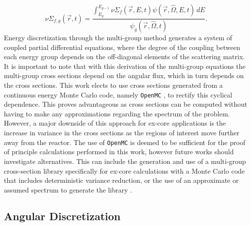 \begin{equation*}
    \nu\Sigma_{f,g}(\vec{r}, t) = \frac{\int_{E_{g}}^{E_{g - 1}}\nu\Sigma_{f}(\vec{r}, E, t)\psi(\vec{r}, \hat{\Omega}, E, t)\, dE}{\psi_{g}(\vec{r}, \hat{\Omega}, t)}\text{.}
\end{equation*}
Energy discretization through the multi-group method generates a system of coupled partial differential equations, where the degree of the coupling between each energy group depends on the off-diagonal elements of the scattering matrix. It is important to note that with this derivation of the multi-group equations the multi-group cross sections depend on the angular flux, which in turn depends on the cross sections. This work elects to use cross sections generated from a continuous energy Monte Carlo code, namely \texttt{OpenMC} \cite{openmc}, to rectify this cyclical dependence. This proves advantageous as cross sections can be computed without having to make any approximations regarding the spectrum of the problem. However, a major downside of this approach for ex-core applications is the increase in variance in the cross sections as the regions of interest move further away from the reactor. The use of \texttt{OpenMC} is deemed to be sufficient for the proof of principle calculations performed in this work, however future works should investigate alternatives. This can include the generation and use of a multi-group cross-section library specifically for ex-core calculations with a Monte Carlo code that includes deterministic variance reduction, or the use of an approximate or assumed spectrum to generate the library \cite{computational_methods}.
 
\subsection{Angular Discretization}
\label{solver:radiation_transport:angle}

